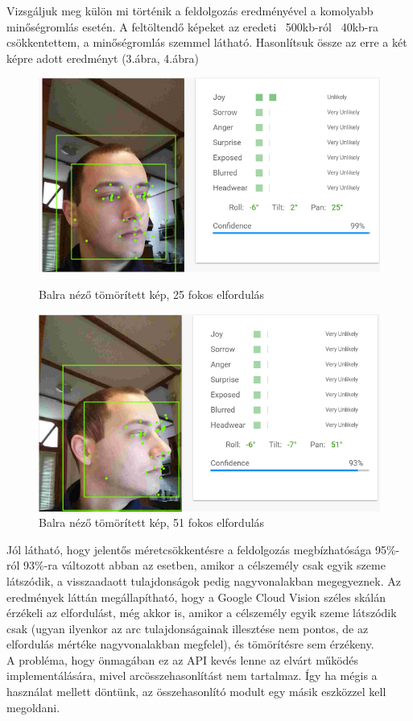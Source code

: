 Vizsgáljuk meg külön mi történik a feldolgozás eredményével a komolyabb minőségromlás esetén. A feltöltendő képeket az eredeti ~500kb-ról ~40kb-ra csökkentettem, a minőségromlás szemmel látható. Hasonlítsuk össze az erre a két képre adott eredményt (3.ábra, 4.ábra)
\begin{figure}[h]
 \begin{minipage}{.5\textwidth} 
\centering
    \includegraphics[scale=0.3]{img/cloud_vision_left_compressed}
    \caption{Balra néző tömörített kép, 25 fokos elfordulás}
 \end{minipage}
 \begin{minipage}{.5\textwidth} 
\centering
     \includegraphics[scale=0.3]{img/cloud_vision_very_left_compressed}
     \caption{Balra néző tömörített kép, 51 fokos elfordulás}
 \end{minipage}
\end{figure}

Jól látható, hogy jelentős méretcsökkentésre a feldolgozás megbízhatósága 95\%-ról 93\%-ra változott abban az esetben, amikor a célszemély csak egyik szeme látszódik, a visszaadaott tulajdonságok pedig nagyvonalakban megegyeznek. 
Az eredmények láttán megállapítható, hogy a Google Cloud Vision széles skálán érzékeli az elfordulást, még akkor is, amikor a célszemély egyik szeme látszódik csak (ugyan ilyenkor az arc tulajdonságainak illesztése nem pontos, de az elfordulás mértéke nagyvonalakban megfelel), és tömörítésre sem érzékeny.
\\A probléma, hogy önmagában ez az API kevés lenne az elvárt működés implementálására, mivel arcösszehasonlítást nem tartalmaz. Így ha mégis a használat mellett döntünk, az összehasonlító modult egy másik eszközzel kell megoldani.

